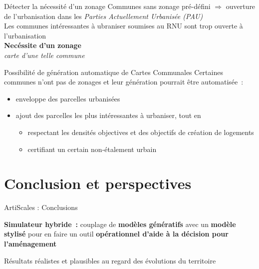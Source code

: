 \documentclass[xcolor=table]{beamer}
\begin{document}
\begin{frame}{Détecter la nécessité d'un zonage}
	Communes sans zonage pré-défini $\Longrightarrow$ ouverture de l'urbanisation dans les \textit{Parties Actuellement Urbanisée (PAU)}
	\\
	Les communes intéressantes à ubraniser soumises au RNU sont trop ouverte à l'urbanisation 
	\\
	\textbf{Necéssite d'un \textbf{zonage}}
	\\ %
	\textit{carte d'une telle commune}
\end{frame}

\begin{frame}{Possibilité de génération automatique de Cartes Communales}
Certaines communes n'ont pas de zonages et leur génération pourrait être automatisée~:
\begin{itemize}
	\item<2-> enveloppe des parcelles urbanisées
	\item<3-> ajout des parcelles les plus intéressantes à urbaniser, tout en 
	\begin{itemize}
			\item<4-> respectant les densités objectives et des objectifs de création de logements
			\item<5-> certifiant un certain non-étalement urbain
	\end{itemize} 
\end{itemize}
\end{frame}




\section{Conclusion et perspectives}




\begin{frame}{ArtiScales : Conclusions}
	\begin{block}{}
		\textbf{Simulateur hybride~:} couplage de \textbf{modèles génératifs} avec un \textbf{modèle stylisé} pour en faire un outil \textbf{opérationnel d'aide à la décision pour l'aménagement}
	\end{block}
	\begin{block}{}
		Résultats réalistes et plausibles au regard des évolutions du territoire
	\end{block}
\end{frame}
\end{document}
